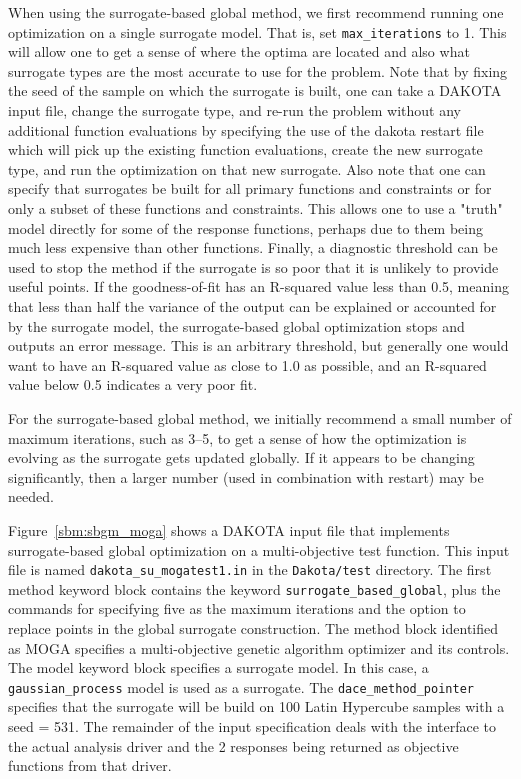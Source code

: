 When using the surrogate-based global method, we first recommend
running one optimization on a single surrogate model. That is, set
\texttt{max\_iterations} to 1.  This will allow one to get a sense of
where the optima are located and also what surrogate types are the
most accurate to use for the problem.  Note that by fixing the seed of
the sample on which the surrogate is built, one can take a DAKOTA
input file, change the surrogate type, and re-run the problem without
any additional function evaluations by specifying the use of the
dakota restart file which will pick up the existing function
evaluations, create the new surrogate type, and run the optimization
on that new surrogate.  Also note that one can specify that surrogates
be built for all primary functions and constraints or for only a
subset of these functions and constraints.  This allows one to use a
"truth" model directly for some of the response functions, perhaps due
to them being much less expensive than other functions.  Finally, a
diagnostic threshold can be used to stop the method if the surrogate
is so poor that it is unlikely to provide useful points.  If the
goodness-of-fit has an R-squared value less than 0.5, meaning that
less than half the variance of the output can be explained or
accounted for by the surrogate model, the surrogate-based global
optimization stops and outputs an error message.  This is an arbitrary
threshold, but generally one would want to have an R-squared value as
close to 1.0 as possible, and an R-squared value below 0.5 indicates a
very poor fit.

For the surrogate-based global method, we initially recommend a small
number of maximum iterations, such as 3--5, to get a sense of how the
optimization is evolving as the surrogate gets updated globally.  If
it appears to be changing significantly, then a larger number (used in
combination with restart) may be needed.

Figure~\ref{sbm:sbgm_moga} shows a DAKOTA input file that implements
surrogate-based global optimization on a multi-objective test function. 
This input file
is named \texttt{dakota\_su\_mogatest1.in} in the \texttt{Dakota/test}
directory.  The first method keyword block contains the
keyword \texttt{surrogate\_based\_global}, plus the commands for
specifying five as the maximum iterations and the option to replace 
points in the global surrogate construction. The method block identified 
as MOGA specifies a multi-objective genetic algorithm optimizer and its 
controls.  The model keyword block specifies a surrogate model.  
In this case, a \texttt{gaussian\_process} model is used as a surrogate. 
The \texttt{dace\_method\_pointer} specifies that the surrogate will be 
build on 100 Latin Hypercube samples with a seed = 531.
The remainder of the input specification deals with the interface 
to the actual analysis driver and the 2 responses being returned 
as objective functions from that driver. 

